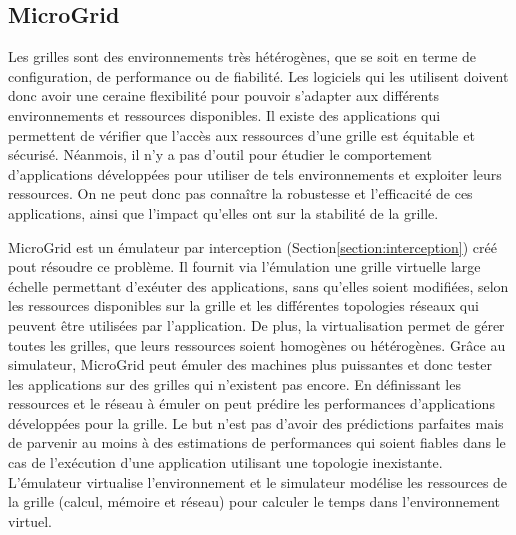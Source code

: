 \subsection{MicroGrid}
\label{subsection:MicroGrid}

Les grilles sont des environnements très hétérogènes, que se soit en terme de configuration, de performance ou de fiabilité. Les logiciels qui les utilisent doivent donc avoir une ceraine flexibilité pour pouvoir s'adapter aux différents environnements et ressources disponibles. Il existe des applications qui permettent de vérifier que l'accès aux ressources d'une grille est équitable et sécurisé. Néanmois, il n'y a pas d'outil pour étudier le comportement d'applications développées pour utiliser de tels environnements et exploiter leurs ressources. On ne peut donc pas connaître la robustesse et l'efficacité de ces applications, ainsi que l'impact qu'elles ont sur la stabilité de la grille. 

MicroGrid \citep{MICROGRID_INIT, MICROGRID_CASANOVA} est un émulateur par interception (Section\ref{section:interception}) créé pout résoudre ce problème. Il fournit via l'émulation une grille virtuelle large échelle permettant d'exéuter des applications, sans qu'elles soient modifiées, selon les ressources disponibles sur la grille et les différentes topologies réseaux qui peuvent être utilisées par l'application. De plus, la virtualisation permet de gérer toutes les grilles, que leurs ressources soient homogènes ou hétérogènes. Grâce au simulateur, %
MicroGrid peut émuler des machines plus puissantes et donc tester les applications sur des grilles qui n'existent pas encore. En définissant les ressources et le réseau à émuler on peut prédire les performances d'applications développées pour la grille. Le but n'est pas d'avoir des prédictions parfaites mais de parvenir au moins à des estimations de performances qui soient fiables dans le cas de l'exécution d'une application utilisant une topologie inexistante. L'émulateur virtualise l'environnement et le simulateur modélise les ressources de la grille (calcul, mémoire et réseau) pour calculer le temps dans l'environnement virtuel.

